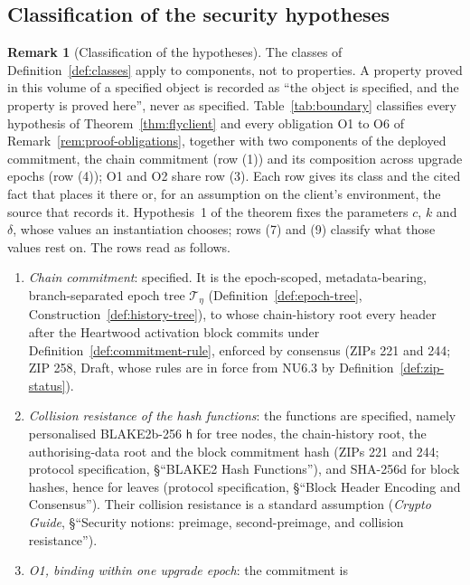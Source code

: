 \documentclass[11pt,a4paper]{article}
\theoremstyle{definition}
\newtheorem{remark}[theorem]{Remark}
\begin{document}
\subsection{Classification of the security hypotheses}
\label{sec:boundary-classes}

\begin{remark}[Classification of the hypotheses]\label{rem:hypotheses}
The classes of Definition~\ref{def:classes} apply to components, not to
properties. A property proved in this volume of a specified object is
recorded as ``the object is specified, and the property is proved here'',
never as specified. Table~\ref{tab:boundary} classifies every hypothesis of
Theorem~\ref{thm:flyclient} and every obligation O1 to O6 of
Remark~\ref{rem:proof-obligations}, together with two components of the
deployed commitment, the chain commitment (row (1)) and its composition
across upgrade epochs (row (4)); O1 and O2 share row (3). Each row gives its
class and the cited fact that places it there or, for an assumption on the
client's environment, the source that records it. Hypothesis~1 of the theorem
fixes the parameters $c$, $k$ and $\delta$, whose values an instantiation
chooses; rows (7) and (9) classify what those values rest on. The rows read as
follows.
\begin{enumerate}[label=(\arabic*)]
\item \emph{Chain commitment}: specified. It is the epoch-scoped,
  metadata-bearing, branch-separated epoch tree $\mathcal{T}_\eta$
  (Definition~\ref{def:epoch-tree}, Construction~\ref{def:history-tree}), to
  whose chain-history root every header after the Heartwood activation block
  commits under Definition~\ref{def:commitment-rule}, enforced by consensus
  (ZIPs 221 and 244; ZIP 258, Draft, whose rules are in force from NU6.3 by
  Definition~\ref{def:zip-status}).
\item \emph{Collision resistance of the hash functions}: the functions are
  specified, namely personalised BLAKE2b-256 $\mathsf{h}$ for tree nodes, the
  chain-history root, the authorising-data root and the block commitment hash
  (ZIPs 221 and 244; protocol specification, \S``BLAKE2 Hash Functions''),
  and SHA-256d for block hashes, hence for leaves (protocol specification,
  \S``Block Header Encoding and Consensus''). Their collision resistance is a
  standard assumption (\emph{Crypto Guide}, \S``Security notions: preimage,
  second-preimage, and collision resistance'').
\item \emph{O1, binding within one upgrade epoch}: the commitment is

\end{enumerate}
\end{remark}
\end{document}
